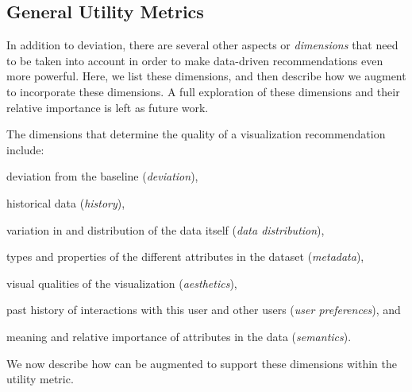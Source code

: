 {%

\subsection{General Utility Metrics}\label{sec:gen_util}


In addition to deviation, there are several other aspects
or {\em dimensions} that need to be taken into account
in order to make data-driven recommendations even more powerful.
Here, we list these dimensions, and then describe how 
we augment \SeeDB to incorporate these dimensions.
A full exploration of these dimensions
and their relative importance is left as future work.
  
The dimensions that determine the quality of a visualization recommendation
include:
  \begin{inparaenum}
  \item deviation from the baseline ({\it deviation}),
  \item historical data ({\em history}),
  \item variation in and distribution of the data itself ({\it data distribution}),
  \item types and properties of the different attributes in the dataset ({\it metadata}), 
\item visual qualities of the visualization ({\it aesthetics}),  
\item past history of interactions with this user and other users ({\it user preferences}), and 
\item meaning and relative importance of attributes in the data ({\it semantics}). 
\end{inparaenum}
We now describe how \SeeDB can be augmented to support these dimensions
within the utility metric.

}
